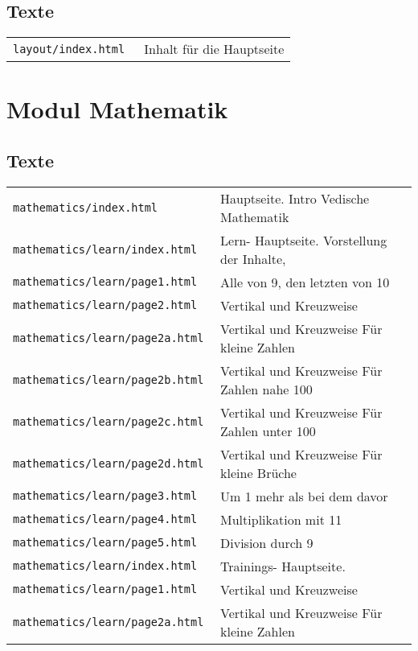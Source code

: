 \subsection{Texte}
\begin{tabular}{ | l | l | } 
  \texttt{layout/index.html           } & Inhalt für die Hauptseite \\
\end{tabular}

\section{Modul Mathematik}
\subsection{Texte}
\begin{tabular}{ | l | l | } 
  \texttt{mathematics/index.html        } & Hauptseite. Intro Vedische Mathematik \\
  \texttt{mathematics/learn/index.html  } & Lern- Hauptseite. Vorstellung der Inhalte, \\
  \texttt{mathematics/learn/page1.html  } & Alle von 9, den letzten von 10 \\
  \texttt{mathematics/learn/page2.html  } & Vertikal und Kreuzweise \\
  \texttt{mathematics/learn/page2a.html } & Vertikal und Kreuzweise Für kleine Zahlen \\
  \texttt{mathematics/learn/page2b.html } & Vertikal und Kreuzweise Für Zahlen nahe 100 \\
  \texttt{mathematics/learn/page2c.html } & Vertikal und Kreuzweise Für Zahlen unter 100 \\
  \texttt{mathematics/learn/page2d.html } & Vertikal und Kreuzweise Für kleine Brüche \\
  \texttt{mathematics/learn/page3.html  } & Um 1 mehr als bei dem davor \\
  \texttt{mathematics/learn/page4.html  } & Multiplikation mit 11 \\
  \texttt{mathematics/learn/page5.html  } & Division durch 9 \\
  \texttt{mathematics/learn/index.html  } & Trainings- Hauptseite. \\
  \texttt{mathematics/learn/page1.html  } & Vertikal und Kreuzweise \\
  \texttt{mathematics/learn/page2a.html } & Vertikal und Kreuzweise Für kleine Zahlen \\

\end{tabular}
